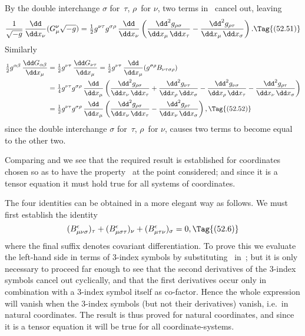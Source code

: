\documentclass[12pt]{book}
\begin{document}
By the double interchange $\sigma$ for~$\tau$, $\rho$~for $\nu$, two terms in~ cancel out,
leaving
\[
\frac{1}{\sqrt{-g}}\, \frac{\dd}{\dd x_{\nu}} (G_{\mu}^{\nu} \sqrt{-g})
= \tfrac{1}{2} g^{\nu\tau} g^{\sigma\rho}\, \frac{\dd}{\dd x_{\nu}} \left(
    \frac{\dd^{2} g_{\rho\sigma}}{\dd x_{\mu}\, \dd x_{\tau}}
  - \frac{\dd^{2} g_{\rho\tau}}{\dd x_{\mu}\, \dd x_{\sigma}}\right).
\Tag{(52.51)}
\]
Similarly
\begin{align*}
  \tfrac{1}{2} g^{\alpha\beta}\, \frac{\dd G_{\alpha\beta}}{\dd x_{\mu}}
  &= \tfrac{1}{2} g^{\nu\tau}\, \frac{\dd G_{\nu\tau}}{\dd x_{\mu}}
  = \tfrac{1}{2} g^{\nu\tau}\, \frac{\dd}{\dd x_{\mu}} (g^{\sigma\rho} B_{\nu\tau\sigma\rho}) \\
  &= \tfrac{1}{4} g^{\nu\tau} g^{\sigma\rho}\, \frac{\dd}{\dd x_{\mu}}
  \left(\frac{\dd^{2} g_{\rho\sigma}}{\dd x_{\nu}\, \dd x_{\tau}}
  + \frac{\dd^{2} g_{\nu\tau}}{\dd x_{\rho}\, \dd x_{\sigma}}
  - \frac{\dd^{2} g_{\nu\sigma}}{\dd x_{\rho}\, \dd x_{\tau}}
  - \frac{\dd^{2} g_{\rho\tau}}{\dd x_{\nu}\, \dd x_{\sigma}}\right) \\
  &= \tfrac{1}{2} g^{\nu\tau} g^{\sigma\rho}\, \frac{\dd}{\dd x_{\mu}} \left(
    \frac{\dd^{2} g_{\rho\sigma}}{\dd x_{\nu}\, \dd x_{\tau}}
  - \frac{\dd^{2} g_{\rho\tau}}{\dd x_{\nu}\, \dd x_{\sigma}}\right),
  \Tag{(52.52)}
\end{align*}
since the double interchange $\sigma$ for~$\tau$, $\rho$~for $\nu$, causes two terms to become
equal to the other two.

Comparing  and  we see that the required result is established
for coordinates chosen so as to have the property~ at the point
considered; and since it is a tensor equation it must hold true for all systems
of coordinates.

The four identities can be obtained in a more elegant way as follows.
We must first establish the identity
\[
(B^{\epsilon}_{\mu\nu\sigma})_\tau + (B^{\epsilon}_{\mu\sigma\tau})_\nu + (B^{\epsilon}_{\mu\tau\nu})_\sigma = 0,
\Tag{(52.6)}
\]
where the final suffix denotes covariant differentiation.
To prove this we evaluate the left-hand side in terms of $3$-index symbols by substituting~
in~;
but it is only necessary to proceed far enough to see that the second derivatives of the $3$-index symbols
cancel out cyclically, and that the first derivatives occur only in combination with a $3$-index symbol itself as
co-factor.
Hence the whole expression will vanish when the $3$-index symbols (but not their derivatives) vanish,
i.e.\ in natural coordinates.
The result is thus proved for natural coordinates, and since it is a tensor equation it will be true for all
coordinate-systems.
\end{document}
